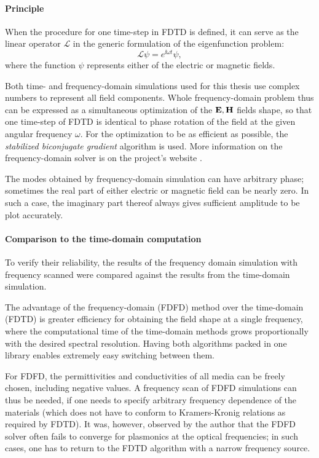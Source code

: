 \paragraph{Principle} 
When the procedure for one time-step in FDTD is defined, it can serve as the linear operator $\mathcal L$ in the generic formulation of the eigenfunction problem:
$$\mathcal{L} \psi = e^{\ii \omega t} \psi,$$
where the function $\psi$ represents either of the electric or magnetic fields. 

Both time- and frequency-domain simulations used for this thesis use complex numbers to represent all field components.
Whole frequency-domain problem thus can be expressed as a simultaneous optimization of the $\mathbf{E}, \mathbf{H}$ fields shape, so that one time-step of FDTD is identical to phase rotation of the field at the given angular frequency $\omega$. For the optimization to be as efficient as possible, the \textit{stabilized biconjugate gradient} algorithm \cite{oskooi2010meep} is used. More information on the frequency-domain solver is on the project's website \cite{ab-initio}. 

The modes obtained by frequency-domain simulation can have arbitrary phase; sometimes the real part of either electric or magnetic field can be nearly zero. In such a case, the imaginary part thereof always gives sufficient amplitude to be plot accurately.

\paragraph{Comparison to the time-domain computation} %
To verify their reliability, the results of the frequency domain simulation with frequency scanned were compared against the results from the time-domain simulation. 

The advantage of the frequency-domain (FDFD) method over the time-domain (FDTD) is greater efficiency for obtaining the field shape at a single frequency, where the computational time of the time-domain methods grows proportionally with the desired spectral resolution. Having both algorithms packed in one library enables extremely easy switching between them. 

For FDFD, the permittivities and conductivities of all media can be freely chosen, including negative values. A frequency scan of FDFD simulations can thus be needed, if one needs to specify arbitrary frequency dependence of the materials (which does not have to conform to Kramers-Kronig relations as required by FDTD). It was, however, observed by the author that the FDFD solver often fails to converge for plasmonics at the optical frequencies; in such cases, one has to return to the FDTD algorithm with a narrow frequency source.
